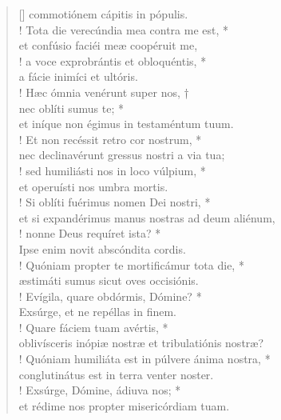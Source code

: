 \begin{verse}[\versewidth]
commotiónem cápitis in pópulis.\\!
\vin Tota die verecúndia mea contra me est, *\\
\vin et confúsio faciéi meæ coopéruit me,\\!
a voce exprobrántis et obloquéntis, *\\
a fácie inimíci et ultóris.\\!
\vin Hæc ómnia venérunt super nos, †\\
\vin nec oblíti sumus te; *\\
\vin et iníque non égimus in testaméntum tuum.\\!
Et non recéssit retro cor nostrum, *\\
nec declinavérunt gressus nostri a via tua;\\!
\vin sed humiliásti nos in loco vúlpium, *\\
\vin et operuísti nos umbra mortis.\\!
Si oblíti fuérimus nomen Dei nostri, *\\
et si expandérimus manus nostras ad deum aliénum,\\!
\vin nonne Deus requíret ista? *\\
\vin Ipse enim novit abscóndita cordis.\\!
Quóniam propter te mortificámur tota die, *\\
æstimáti sumus sicut oves occisiónis.\\!
\vin Evígila, quare obdórmis, Dómine? *\\
\vin Exsúrge, et ne repéllas in finem.\\!
Quare fáciem tuam avértis, *\\
oblivísceris inópiæ nostræ et tribulatiónis nostræ?\\!
\vin Quóniam humiliáta est in púlvere ánima nostra, *\\
\vin conglutinátus est in terra venter noster.\\!
Exsúrge, Dómine, ádiuva nos; *\\
et rédime nos propter misericórdiam tuam.\\
\end{verse}
\vspace{1cm}


